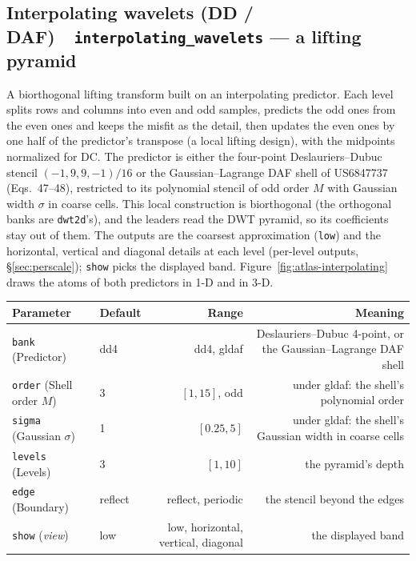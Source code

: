 \documentclass[10pt]{article}
\newcommand{\dev}[1]{\texttt{#1}}
\newcommand{\tool}[2]{#1~\textperiodcentered~\dev{#2}}
\begin{document}
\subsection{\tool{Interpolating wavelets (DD / DAF)}{interpolating\_wavelets} --- a lifting pyramid}\label{sec:interpolating-wavelets}
A biorthogonal lifting transform built on an interpolating predictor. Each level splits rows and
columns into even and odd samples, predicts the odd ones from the even ones and keeps the misfit as
the detail, then updates the even ones by one half of the predictor's transpose (a local lifting
design), with the midpoints normalized for DC. The predictor is either the four-point
Deslauriers--Dubuc stencil $(-1, 9, 9, -1)/16$ or the Gaussian--Lagrange DAF shell of US6847737
(Eqs.~47--48), restricted to its polynomial stencil of odd order $M$ with Gaussian width $\sigma$ in
coarse cells. This local construction is biorthogonal (the orthogonal banks are \dev{dwt2d}'s), and
the leaders read the DWT pyramid, so its coefficients stay out of them. The outputs are the coarsest approximation (\texttt{low}) and
the horizontal, vertical and diagonal details at each level (per-level outputs,
\S\ref{sec:perscale}); \texttt{show} picks the displayed band. Figure~\ref{fig:atlas-interpolating}
draws the atoms of both predictors in 1-D and in 3-D.

\begin{longtable}{P l R N}
\toprule Parameter & Default & Range & Meaning \\ \midrule
\texttt{bank} (Predictor) & dd4 & dd4, gldaf & Deslauriers--Dubuc 4-point, or the Gaussian--Lagrange DAF shell \\
\texttt{order} (Shell order $M$) & 3 & $[1,15]$, odd & under gldaf: the shell's polynomial order \\
\texttt{sigma} (Gaussian $\sigma$) & 1 & $[0.25,5]$ & under gldaf: the shell's Gaussian width in coarse cells \\
\texttt{levels} (Levels) & 3 & $[1,10]$ & the pyramid's depth \\
\texttt{edge} (Boundary) & reflect & reflect, periodic & the stencil beyond the edges \\
\texttt{show} (\emph{view}) & low & low, horizontal, vertical, diagonal & the displayed band \\
\bottomrule
\end{longtable}

\end{document}
